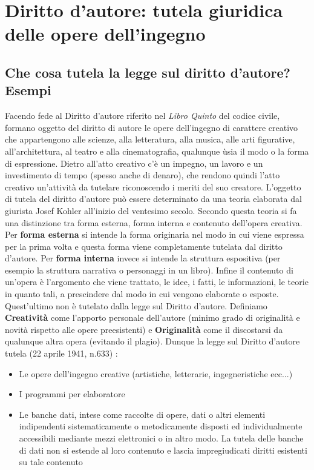 \newpage
\section{Diritto d'autore: tutela giuridica delle opere dell'ingegno}

\subsection{Che cosa tutela la legge sul diritto d'autore? Esempi}
Facendo fede al Diritto d'autore riferito nel \textit{Libro Quinto} del codice civile,
formano oggetto del diritto di autore le opere dell'ingegno di carattere
creativo che appartengono alle scienze, alla letteratura, alla musica, alle
arti figurative, all'architettura, al teatro e alla cinematografia, qualunque
ùsia il modo o la forma di espressione.\newline
Dietro all'atto creativo c'è un impegno, un lavoro e un investimento di
tempo (spesso anche di denaro), che rendono quindi l'atto creativo un'attività
da tutelare riconoscendo i meriti del suo creatore. L'oggetto di tutela del diritto
d'autore può essere determinato da una teoria elaborata dal giurista
Josef Kohler all'inizio del ventesimo secolo.\newline
Secondo questa teoria si fa una distinzione tra forma esterna, forma interna
e contenuto dell'opera creativa. Per \textbf{forma esterna} si intende la forma
originaria nel modo in cui viene espressa per la prima volta e questa
forma viene completamente tutelata dal diritto d'autore. Per \textbf{forma interna}
invece si intende la struttura espositiva (per esempio la struttura narrativa o
personaggi in un libro). Infine il contenuto di un'opera è l'argomento che viene
trattato, le idee, i fatti, le informazioni, le teorie in quanto tali,
a prescindere dal modo in cui vengono elaborate o esposte. Quest'ultimo
non è tutelato dalla legge sul Diritto d'autore. \newline
Definiamo \textbf{Creatività} come l'apporto personale dell'autore (minimo
grado di originalità e novità rispetto alle opere preesistenti) e \textbf{Originalità}
come il discostarsi da qualunque altra opera (evitando il plagio). Dunque
la legge sul Diritto d'autore tutela (22 aprile 1941, n.633) :
\begin{itemize}
    \item Le opere dell'ingegno creative (artistiche, letterarie, ingegneristiche ecc...)
    \item I programmi per elaboratore
    \item Le banche dati, intese come raccolte di opere, dati o altri elementi
    indipendenti sistematicamente o metodicamente disposti ed individualmente
    accessibili mediante mezzi elettronici o in altro modo. La tutela delle banche
    di dati non si estende al loro contenuto e lascia impregiudicati diritti esistenti
    su tale contenuto
\end{itemize}
